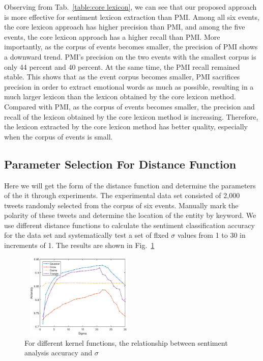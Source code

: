 \documentclass[runningheads]{llncs}
\begin{document}
Observing from Tab.~\ref{table:core lexicon}, we can see that our proposed approach is more effective for sentiment lexicon extraction than PMI. Among all six events, the core lexicon approach has higher precision than PMI, and among the five events, the core lexicon approach has a higher recall than PMI. More importantly, as the corpus of events becomes smaller, the precision of PMI shows a downward trend. PMI's precision on the two events with the smallest corpus is only 44 percent and 40 percent. At the same time, the PMI recall remained stable. This shows that as the event corpus becomes smaller, PMI sacrifices precision in order to extract emotional words as much as possible, resulting in a much larger lexicon than the lexicon obtained by the core lexicon method. Compared with PMI, as the corpus of events becomes smaller, the precision and recall of the lexicon obtained by the core lexicon method is increasing. Therefore, the lexicon extracted by the core lexicon method has better quality, especially when the corpus of events is small.
\subsection{Parameter Selection For Distance Function}
Here we will get the form of the distance function and determine the parameters of the it through experiments. The experimental data set consisted of 2,000 tweets randomly selected from the corpus of six events. Manually mark the polarity of these tweets and determine the location of the entity by keyword. We use different distance functions to calculate the sentiment classification accuracy for the data set and systematically test a set of flxed $\sigma$ values from 1 to 30 in increments of 1. The results are shown in Fig.~\ref{fig:sigma}

\vspace{-0.5cm}
\begin{figure}
    \centering
    \includegraphics[width=0.5\textwidth,height=1.6in]{sigma.eps}
    \setlength{\abovecaptionskip}{-0.1cm}
    \caption{For different kernel functions, the relationship between sentiment analysis accuracy and $\sigma$}\label{fig:sigma}
\end{figure}
\end{document}
